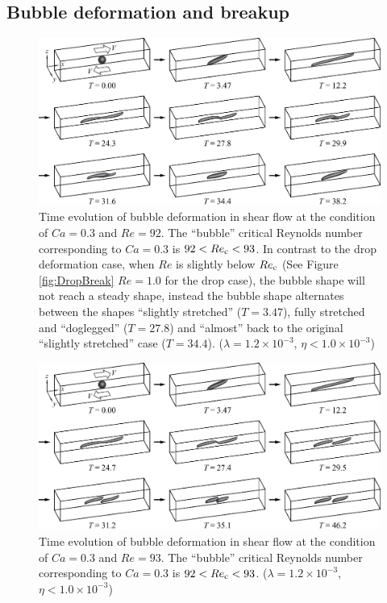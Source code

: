\documentclass{elsarticle}
\begin{document}
\subsection{Bubble deformation and breakup}
% 
\begin{figure}%
  \centering
  \includegraphics[width=\textwidth]{Figure/5-BubbleBreakCa0p3Re92}
  \caption{Time evolution of bubble deformation in shear flow at the
           condition of $Ca=0.3$ and $Re=92$.  
	   The ``bubble'' 
	   critical Reynolds number corresponding to $Ca=0.3$ is
	   $92<Re_{\rm c}<93$.  In contrast to the drop deformation case,
           when $Re$ is slightly below $Re_{\rm c}$
           (See Figure \ref{fig:DropBreak} $Re=1.0$ for the drop case), 
           the bubble shape will
           not reach a steady shape, instead the bubble shape alternates
           between the shapes ``slightly stretched'' ($T=3.47$),
           fully stretched and ``doglegged'' ($T=27.8$) and ``almost''
           back to the original ``slightly stretched'' case 
           ($T=34.4$). 
           ($\lambda = 1.2 \times 10^{-3}$, $\eta < 1.0 \times 10^{-3}$) 
	   }
  \label{fig:BubbleBreakCa0p3Re92}
\end{figure}
%
\begin{figure}%
  \centering
  \includegraphics[width=\textwidth]{Figure/6-BubbleBreakCa0p3Re93}
  \caption{Time evolution of bubble deformation in shear flow at the
           condition of $Ca=0.3$ and $Re=93$.
	   The ``bubble'' 
	   critical Reynolds number corresponding to $Ca=0.3$ is
	   $92<Re_{\rm c}<93$.
           ($\lambda = 1.2 \times 10^{-3}$, $\eta < 1.0 \times 10^{-3}$) 
	   }
  \label{fig:BubbleBreakCa0p3Re93}
\end{figure}
\end{document}

